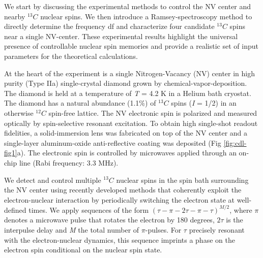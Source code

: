 We start by discussing the experimental methods to control the NV center and nearby $^{13}C$  nuclear spins. We then introduce a Ramsey-spectroscopy method to directly determine the frequency df and characterize four candidate $^{13}C$  spins near a single NV-center. These experimental results highlight the universal presence of controllable nuclear spin memories and provide a realistic set of input parameters for the theoretical calculations.

At the heart of the experiment is a single Nitrogen-Vacancy (NV) center in high purity (Type IIa) single-crystal diamond grown by chemical-vapor-deposition. The diamond is held at a temperature of \textit{T} = 4.2 K in a Helium bath cryostat. The diamond has a natural abundance (1.1\%) of $^{13}C$ spins (\textit{I} = 1/2) in an otherwise $^{12}C$ spin-free lattice. The NV electronic spin is polarized and measured optically by spin-selective resonant excitation\cite{Togan_Nature_2010,Tamarat_NewJ.Phys._2008,Robledo_Nature_2011}. To obtain high single-shot readout fidelities, a solid-immersion lens was fabricated on top of the NV center and a single-layer aluminum-oxide anti-reflective coating was deposited\cite{Pfaff_Science_2014} (Fig \ref{fig:cdl-fig1}a). The electronic spin is controlled by microwaves applied through an on-chip line (Rabi frequency: 3.3 MHz).     

We detect and control multiple $^{13}C$ nuclear spins in the spin bath surrounding the NV center using recently developed methods that coherently exploit the electron-nuclear interaction by periodically switching the electron state at well-defined times\cite{Taminiau_Phys.Rev.Lett._2012,Kolkowitz_Phys.Rev.Lett._2012,Zhao_NatNano_2012,Taminiau_NatNano_2014}. We apply sequences of the form $(\tau - \pi - 2\tau - \pi - \tau)^{M/2}$, where $\pi$ denotes a microwave pulse that rotates the electron by 180 degrees, $2\tau$ is the interpulse delay and \textit{M} the total number of $\pi$-pulses. For $\tau$ precisely resonant with the electron-nuclear dynamics, this sequence imprints a phase on the electron spin conditional on the nuclear spin state. 

